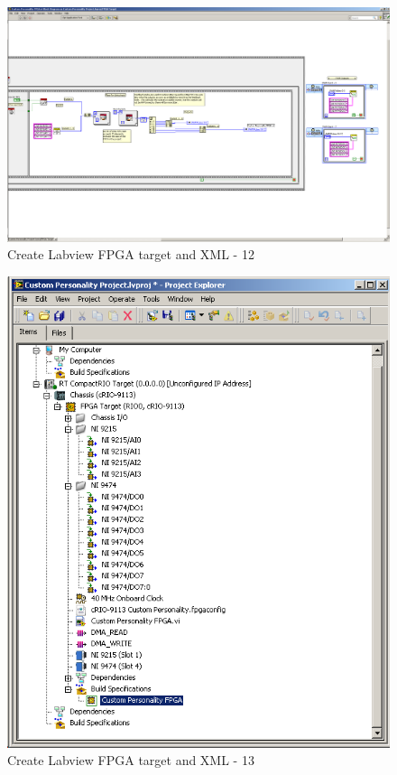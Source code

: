 \documentclass[a4paper,english]{report}
\begin{document}
\begin{figure}[htb!]
	\centering \includegraphics[angle=-90,scale=0.45]{Screenshots/Screenshot_2015-01-16_20-07-43.png}
	\caption{Create Labview FPGA target and XML - 12}
	\label{fig: Create Labview FPGA target and XML-12} 
\end{figure}
\begin{figure}[htb!]
	\centering \includegraphics[scale=0.45]{Screenshots/Screenshot_2015-01-16_19-52-25.png}
	\caption{Create Labview FPGA target and XML - 13}
	\label{fig: Create Labview FPGA target and XML-13} 
\end{figure}
\end{document}
